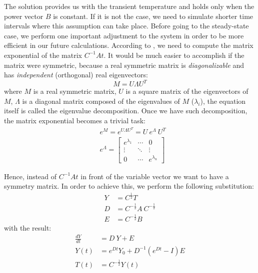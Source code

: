 The solution provides us with the transient temperature and holds only when the power vector $B$ is constant. If it is not the case, we need to simulate shorter time intervals where this assumption can take place. Before going to the steady-state case, we perform one important adjustment to the system in order to be more efficient in our future calculations. According to , we need to compute the matrix exponential of the matrix $C^{-1} A t$. It would be much easier to accomplish if the matrix were symmetric, because a real symmetric matrix is \emph{diagonalizable} and has \emph{independent} (orthogonal) real eigenvectors:
\begin{equation} \label{eq:eigenvalue-decomposition}
  M = U \Lambda U^T
\end{equation}
where $M$ is a real symmetric matrix, $U$ is a square matrix of the eigenvectors of $M$, $\Lambda$ is a diagonal matrix composed of the eigenvalues of $M$ ($\lambda_i$), the equation itself is called the eigenvalue decomposition. Once we have such decomposition, the matrix exponential becomes a trivial task:
\begin{align}
  & e^M = e^{U \Lambda U^T} = U \: e^{\Lambda} \: U^T \nonumber \\
  & e^{\Lambda} = \left[
      \begin{array}{ccc}
        e^{\lambda_1} & \cdots & 0 \\
        \vdots & \ddots & \vdots \\
        0 & \cdots & e^{\lambda_{n}}
      \end{array}
    \right] \nonumber
\end{align}

Hence, instead of $C^{-1} A t$ in front of the variable vector we want to have a symmetry matrix. In order to achieve this, we perform the following substitution:
\begin{align*}
  Y & = C^{\frac{1}{2}} T \\
  D & = C^{-\frac{1}{2}} A \: C^{-\frac{1}{2}} \\
  E & = C^{-\frac{1}{2}} B
\end{align*}
with the result:
\begin{align}
  \frac{dY}{dt} & = D \: Y + E \nonumber \\
  Y(t) & = e^{D t} Y_0 + D^{-1} (e^{D t} - I) E \label{eq:modified-solution} \\
  T(t) & = C^{-\frac{1}{2}} Y(t) \label{eq:finalization}
\end{align}

